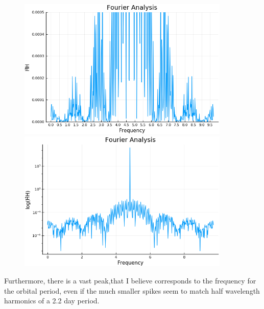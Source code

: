 \documentclass[a4paper,12pt,notitlepage]{article}
\begin{document}
\begin{figure}[h]
    \centering
    \begin{minipage}{0.5\textwidth}
        \centering
        \includegraphics[width=0.9\textwidth]{ftfull.png} 
    \end{minipage}\hfill
    \begin{minipage}{0.5\textwidth}
        \centering
        \includegraphics[width=0.9\textwidth]{logfull.png} 
    \end{minipage}
\end{figure}

Furthermore, there is a vast peak,that I believe corresponds to the frequency for the orbital period, even if the much smaller spikes seem to match half wavelength harmonics of a 2.2 day period.
\end{document}
